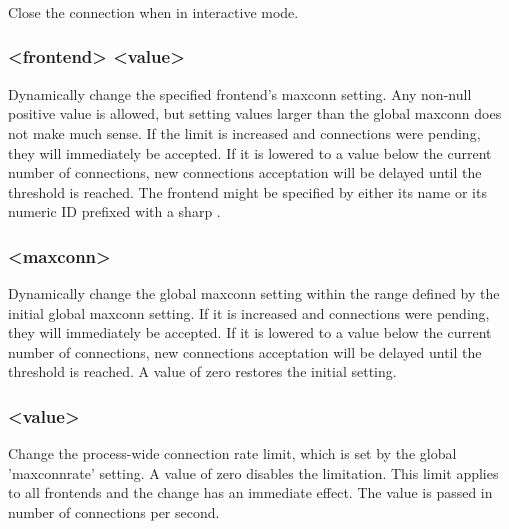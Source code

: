 \subsubsection[quit]{}

  Close the connection when in interactive mode.

\subsubsection[set maxconn frontend]{ <frontend> <value>}

  Dynamically change the specified frontend's maxconn setting. Any non-null
  positive value is allowed, but setting values larger than the global maxconn
  does not make much sense. If the limit is increased and connections were
  pending, they will immediately be accepted. If it is lowered to a value below
  the current number of connections, new connections acceptation will be
  delayed until the threshold is reached. The frontend might be specified by
  either its name or its numeric ID prefixed with a sharp \chr{\#}.

\subsubsection[set maxconn global]{ <maxconn>}

  Dynamically change the global maxconn setting within the range defined by the
  initial global maxconn setting. If it is increased and connections were
  pending, they will immediately be accepted. If it is lowered to a value below
  the current number of connections, new connections acceptation will be
  delayed until the threshold is reached. A value of zero restores the initial
  setting.

\subsubsection[set rate-limit connections global]{ <value>}

  Change the process-wide connection rate limit, which is set by the global
  'maxconnrate' setting. A value of zero disables the limitation. This limit
  applies to all frontends and the change has an immediate effect. The value
  is passed in number of connections per second.

